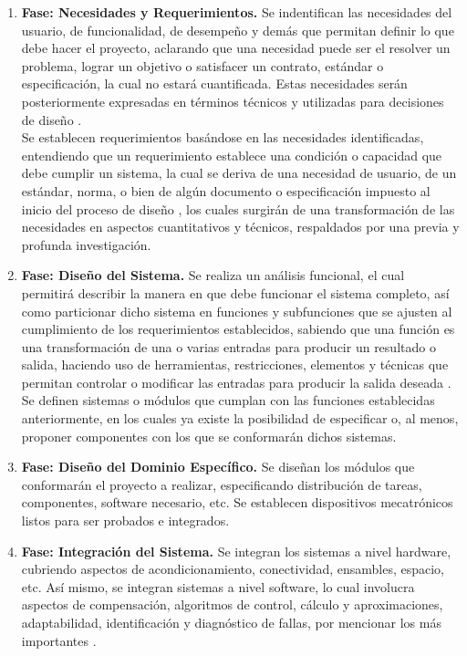 \begin{enumerate}
	\item \textbf{Fase: Necesidades y Requerimientos.} Se indentifican las necesidades del usuario, de funcionalidad, de desempeño y demás que permitan definir lo que debe hacer el proyecto, aclarando que una necesidad puede ser el resolver un problema, lograr un objetivo o satisfacer un contrato, estándar o especificación, la cual no estará cuantificada. Estas necesidades serán posteriormente expresadas en términos técnicos y utilizadas para decisiones de diseño \cite{I1}.\\
	
	Se establecen requerimientos basándose en las necesidades identificadas, entendiendo que un requerimiento establece una condición o capacidad que debe cumplir un sistema, la cual se deriva de una necesidad de usuario, de un estándar, norma, o bien de algún documento o especificación impuesto al inicio del proceso de diseño \cite{I12}, los cuales surgirán de una transformación de las necesidades en aspectos cuantitativos y técnicos, respaldados por una previa y profunda investigación.
	
	\item \textbf{Fase: Diseño del Sistema.} Se realiza un análisis funcional, el cual permitirá describir la manera en que debe funcionar el sistema completo, así como particionar dicho sistema en funciones y subfunciones que se ajusten al cumplimiento de los requerimientos establecidos, sabiendo que una función es una transformación de una o varias entradas para producir un resultado o salida, haciendo uso de herramientas, restricciones, elementos y técnicas que permitan controlar o modificar las entradas para producir la salida deseada \cite{M14}. Se definen sistemas o módulos que cumplan con las funciones establecidas anteriormente, en los cuales ya existe la posibilidad de especificar o, al menos, proponer componentes con los que se conformarán dichos sistemas.
	
	\item \textbf{Fase: Diseño del Dominio Específico.}	Se diseñan los módulos que conformarán el proyecto a realizar, especificando distribución de tareas, componentes, software necesario, etc. Se establecen dispositivos mecatrónicos listos para ser probados e integrados.
	
	\item \textbf{Fase: Integración del Sistema.} Se integran los sistemas a nivel hardware, cubriendo aspectos de acondicionamiento, conectividad, ensambles, espacio, etc. Así mismo, se integran sistemas a nivel software, lo cual involucra aspectos de compensación, algoritmos de control, cálculo y aproximaciones, adaptabilidad, identificación y diagnóstico de fallas, por mencionar los más importantes \cite{M15}.
	

\end{enumerate}

